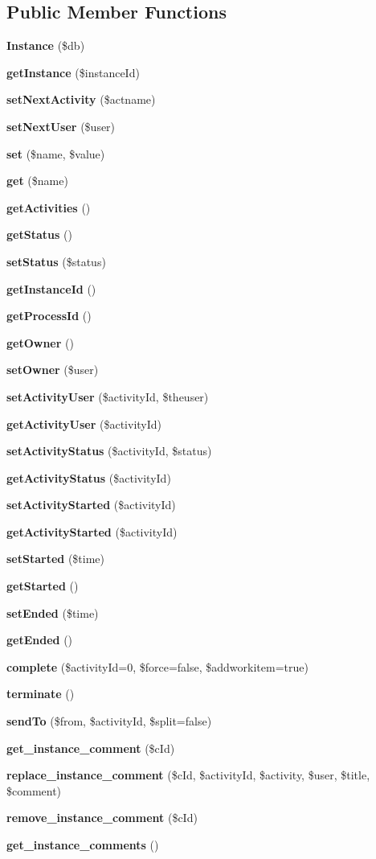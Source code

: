 \subsection*{Public Member Functions}
\begin{CompactItemize}
\item 
{\bf Instance} (\$db)\label{classInstance_a0}

\item 
{\bf get\-Instance} (\$instance\-Id)
\item 
{\bf set\-Next\-Activity} (\$actname)
\item 
{\bf set\-Next\-User} (\$user)
\item 
{\bf set} (\$name, \$value)
\item 
{\bf get} (\$name)
\item 
{\bf get\-Activities} ()
\item 
{\bf get\-Status} ()
\item 
{\bf set\-Status} (\$status)
\item 
{\bf get\-Instance\-Id} ()
\item 
{\bf get\-Process\-Id} ()
\item 
{\bf get\-Owner} ()
\item 
{\bf set\-Owner} (\$user)
\item 
{\bf set\-Activity\-User} (\$activity\-Id, \$theuser)
\item 
{\bf get\-Activity\-User} (\$activity\-Id)
\item 
{\bf set\-Activity\-Status} (\$activity\-Id, \$status)
\item 
{\bf get\-Activity\-Status} (\$activity\-Id)
\item 
{\bf set\-Activity\-Started} (\$activity\-Id)
\item 
{\bf get\-Activity\-Started} (\$activity\-Id)
\item 
{\bf set\-Started} (\$time)
\item 
{\bf get\-Started} ()
\item 
{\bf set\-Ended} (\$time)
\item 
{\bf get\-Ended} ()
\item 
{\bf complete} (\$activity\-Id=0, \$force=false, \$addworkitem=true)
\item 
{\bf terminate} ()
\item 
{\bf send\-To} (\$from, \$activity\-Id, \$split=false)
\item 
{\bf get\_\-instance\_\-comment} (\$c\-Id)
\item 
{\bf replace\_\-instance\_\-comment} (\$c\-Id, \$activity\-Id, \$activity, \$user, \$title, \$comment)
\item 
{\bf remove\_\-instance\_\-comment} (\$c\-Id)
\item 
{\bf get\_\-instance\_\-comments} ()
\end{CompactItemize}
